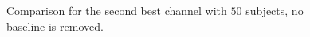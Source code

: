 \documentclass[oneside, a4paper,10pt]{report}
\begin{document}
\begin{landscape}
\begin{figure}[H]
\begin{tikzpicture}
  \end{tikzpicture}
  \caption{Comparison for the second best channel with $50$ subjects, no baseline is removed.}
  \label{fg:2Ch_S50_B0_RA}
\end{figure}

\end{landscape}
\end{document}
